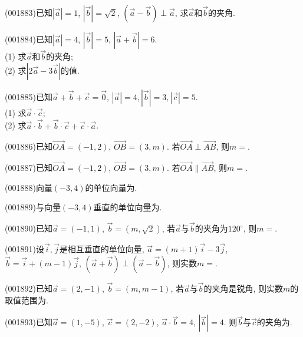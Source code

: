 \item (001883)已知$|\overrightarrow{a}|=1$, $|\overrightarrow{b}|=\sqrt{2}$, $(\overrightarrow{a}-\overrightarrow{b})\perp\overrightarrow{a}$,
求$\overrightarrow{a}$和$\overrightarrow{b}$的夹角.
\item (001884)已知$|\overrightarrow{a}|=4$, $|\overrightarrow{b}|=5$, $|\overrightarrow{a}+\overrightarrow{b}|=6$.\\ 
(1) 求$\overrightarrow{a}$和$\overrightarrow{b}$的夹角;\\ 
(2) 求$|2\overrightarrow{a}-3\overrightarrow{b}|$的值.
\item (001885)已知$\overrightarrow{a}+\overrightarrow{b}+\overrightarrow{c}=\overrightarrow{0}$, $|\overrightarrow{a}|=4,|\overrightarrow{b}|=3,|\overrightarrow{c}|=5$.\\ 
(1) 求$\overrightarrow{a}\cdot\overrightarrow{c}$;\\ 
(2) 求$\overrightarrow{a}\cdot\overrightarrow{b}+\overrightarrow{b}\cdot\overrightarrow{c}+\overrightarrow{c}\cdot\overrightarrow{a}$.
\item (001886)已知$\overrightarrow{OA}=(-1,2)$, $\overrightarrow{OB}=(3,m)$. 若$\overrightarrow{OA}\perp \overrightarrow{AB}$, 则$m=$.
\item (001887)已知$\overrightarrow{OA}=(-1,2)$, $\overrightarrow{OB}=(3,m)$. 若$\overrightarrow{OA}\parallel\overrightarrow{AB}$, 则$m=$.
\item (001888)向量$(-3,4)$的单位向量为.
\item (001889)与向量$(-3,4)$垂直的单位向量为.
\item (001890)已知$\overrightarrow{a}=(-1,1)$, $\overrightarrow{b}=(m,\sqrt{2})$, 若$\overrightarrow{a}$与$\overrightarrow{b}$的夹角为$120^\circ$, 则$m=$.
\item (001891)设$\overrightarrow{i},\overrightarrow{j}$是相互垂直的单位向量, $\overrightarrow{a}=(m+1)\overrightarrow{i}-3\overrightarrow{j}$, $\overrightarrow{b}=\overrightarrow{i}+(m-1)\overrightarrow{j}$, $(\overrightarrow{a}+\overrightarrow{b})\perp (\overrightarrow{a}-\overrightarrow{b})$, 则实数$m=$.
\item (001892)已知$\overrightarrow{a}=(2,-1)$, $\overrightarrow{b}=(m,m-1)$, 若$\overrightarrow{a}$与$\overrightarrow{b}$的夹角是锐角, 则实数$m$的取值范围为.
\item (001893)已知$\overrightarrow{a}=(1,-5)$, $\overrightarrow{c}=(2,-2)$, $\overrightarrow{a}\cdot\overrightarrow{b}=4$, $|\overrightarrow{b}|=4$. 则$\overrightarrow{b}$与$\overrightarrow{c}$的夹角为.

